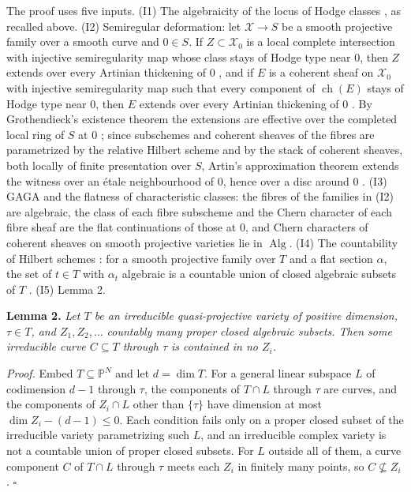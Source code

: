 \documentclass[10pt,twocolumn]{article}
\begin{document}
The proof uses five inputs. (I1) The algebraicity of the locus of Hodge
classes \cite{cdk1995}, as recalled above. (I2) Semiregular deformation:
let \(\mathcal{X}\to S\) be a smooth projective family over a smooth
curve and \(0\in S\). If \(Z\subset\mathcal{X}_0\) is a local complete
intersection with injective semiregularity map whose class stays of
Hodge type near \(0\), then \(Z\) extends over every Artinian thickening
of \(0\) \cite{bloch1972,nishinou2020}, and if \(E\) is a coherent sheaf
on \(\mathcal{X}_0\) with injective semiregularity map such that every
component of \(\operatorname{ch}(E)\) stays of Hodge type near \(0\),
then \(E\) extends over every Artinian thickening of \(0\)
\cite{bf2003}. By Grothendieck's existence theorem the extensions are
effective over the completed local ring of \(S\) at \(0\) \cite{ega3};
since subschemes and coherent sheaves of the fibres are parametrized by
the relative Hilbert scheme and by the stack of coherent sheaves, both
locally of finite presentation over \(S\), Artin's approximation theorem
extends the witness over an étale neighbourhood of \(0\), hence over a
disc around \(0\) \cite{grothendieck1961,lieblich2006,artin1969}. (I3)
GAGA \cite{serre1956} and the flatness of characteristic classes: the
fibres of the families in (I2) are algebraic, the class of each fibre
subscheme and the Chern character of each fibre sheaf are the flat
continuations of those at \(0\), and Chern characters of coherent
sheaves on smooth projective varieties lie in \(\operatorname{Alg}\).
(I4) The countability of Hilbert schemes \cite{grothendieck1961}: for a
smooth projective family over \(T\) and a flat section \(\alpha\), the
set of \(t\in T\) with \(\alpha_t\) algebraic is a countable union of
closed algebraic subsets of \(T\) \cite{voisin2003}. (I5) Lemma 2.

\textbf{Lemma 2.} \emph{Let \(T\) be an irreducible quasi-projective
variety of positive dimension, \(\tau\in T\), and \(Z_1,Z_2,\dots\)
countably many proper closed algebraic subsets. Then some irreducible
curve \(C\subseteq T\) through \(\tau\) is contained in no \(Z_i\).}

\emph{Proof.} Embed \(T\subseteq\mathbb{P}^N\) and let \(d=\dim T\). For
a general linear subspace \(L\) of codimension \(d-1\) through \(\tau\),
the components of \(T\cap L\) through \(\tau\) are curves, and the
components of \(Z_i\cap L\) other than \(\{\tau\}\) have dimension at
most \(\dim Z_i-(d-1)\le 0\). Each condition fails only on a proper
closed subset of the irreducible variety parametrizing such \(L\), and
an irreducible complex variety is not a countable union of proper closed
subsets. For \(L\) outside all of them, a curve component \(C\) of
\(T\cap L\) through \(\tau\) meets each \(Z_i\) in finitely many points,
so \(C\not\subseteq Z_i\). \(\square\)
\end{document}

